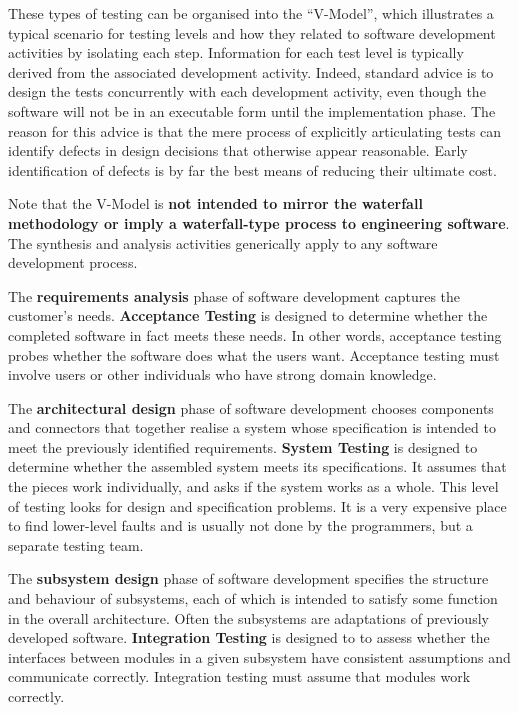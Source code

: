 
These types of testing can be organised into the ``V-Model'', which illustrates
a typical scenario for testing levels and how they related to software
development activities by isolating each step. Information for each test level
is typically derived from the associated development activity. Indeed, standard
advice is to design the tests concurrently with each development activity, even
though the software will not be in an executable form until the implementation
phase. The reason for this advice is that the mere process of explicitly
articulating tests can identify defects in design decisions that otherwise
appear reasonable. Early identification of defects is by far the best means of
reducing their ultimate cost. 


Note that the V-Model is {\bf not intended to mirror the waterfall methodology
or imply a waterfall-type process to engineering software}. The synthesis and
analysis activities generically apply to any software development process.


The {\bf requirements analysis} phase of software development captures the
customer's needs. {\bf Acceptance Testing} is designed to determine whether the
completed software in fact meets these needs. In other words, acceptance testing
probes whether the software does what the users want. Acceptance testing must
involve users or other individuals who have strong domain knowledge.

The {\bf architectural design} phase of software development chooses components
and connectors that together realise a system whose specification is intended to
meet the previously identified requirements. {\bf System Testing} is designed to
determine whether the assembled system meets its specifications. It assumes that
the pieces work individually, and asks if the system works as a whole. This
level of testing looks for design and specification problems. It is a very
expensive place to find lower-level faults and is usually not done by the
programmers, but a separate testing team.

The {\bf subsystem design} phase of software development specifies the structure
and behaviour of subsystems, each of which is intended to satisfy some function
in the overall architecture. Often the subsystems are adaptations of previously
developed software. {\bf Integration Testing} is designed to to assess whether
the interfaces between modules in a given subsystem have consistent assumptions
and communicate correctly. Integration testing must assume that modules work
correctly. 

